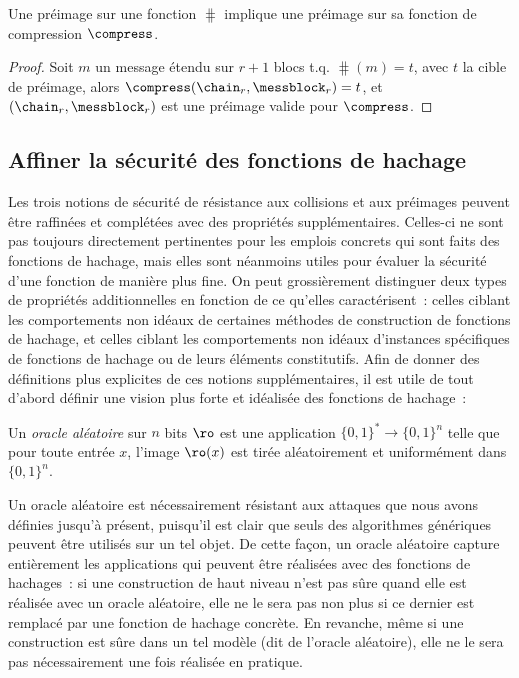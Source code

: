 \begin{prop}
Une préimage sur une fonction \merkdam $\hash$ implique une préimage sur sa fonction de compression
$\compress$.
\end{prop}
\begin{proof}
Soit 
$m$ un message étendu sur  $r+1$ blocs t.q. $\hash(m) = t$, avec $t$ la cible de préimage, alors
$\compress(\chain_r, \messblock_r) = t$, et $(\chain_r, \messblock_r)$ est une préimage valide pour $\compress$.
\end{proof}

\subsection{Affiner la sécurité des fonctions de hachage\label{sec:frefmd}}

Les trois notions de sécurité de résistance aux collisions et aux préimages peuvent être raffinées et complétées avec des propriétés supplémentaires.
Celles-ci ne sont pas toujours directement pertinentes pour les emplois concrets qui sont faits des fonctions de hachage, mais elles sont néanmoins
utiles pour évaluer la sécurité d'une fonction de manière plus fine.
On peut grossièrement distinguer deux types de propriétés additionnelles en fonction de ce qu'elles caractérisent~: celles ciblant les comportements
non idéaux de certaines méthodes de construction de fonctions de hachage, et celles ciblant les comportements
non idéaux d'instances spécifiques de fonctions de hachage ou de leurs éléments constitutifs.
Afin de donner des définitions plus explicites de ces notions supplémentaires, il est utile de tout d'abord définir une vision plus forte et idéalisée des
fonctions de hachage~: 

\begin{fdefi}
Un \emph{oracle aléatoire} sur $n$ bits
$\ro$ est une application $\{0,1\}^* \rightarrow \{0,1\}^n$ telle que pour toute entrée $x$,
l'image $\ro(x)$ est tirée aléatoirement et uniformément dans $\{0,1\}^n$.
\end{fdefi}

Un oracle aléatoire est nécessairement résistant aux attaques que nous avons définies jusqu'à présent, puisqu'il est clair
que seuls des algorithmes génériques peuvent être utilisés sur un tel objet. De cette façon, un oracle aléatoire capture
entièrement les applications qui peuvent être réalisées avec des fonctions de hachages~: si une construction de haut niveau
n'est pas sûre quand elle est réalisée avec un oracle aléatoire, elle ne le sera pas non plus si ce dernier est remplacé par une fonction
de hachage concrète. En revanche, même si une construction est sûre dans un tel modèle (dit de l'oracle aléatoire), elle ne le sera
pas nécessairement
une fois réalisée en pratique.


